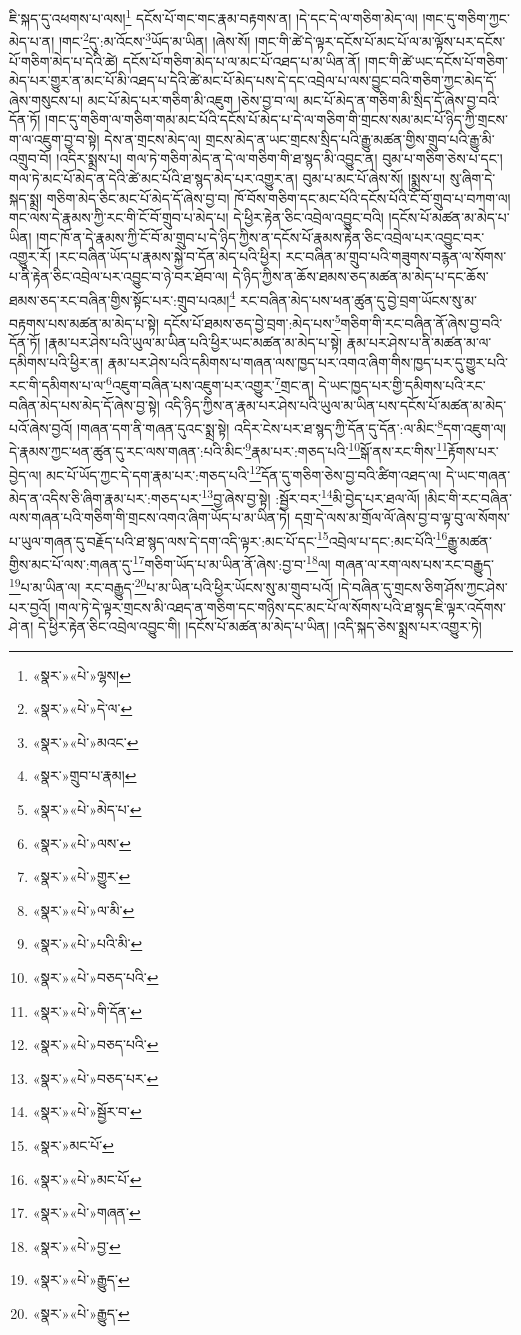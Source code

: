 ཇི་སྐད་དུ་འཕགས་པ་ལས།\footnote{«སྣར་»«པེ་»ལྷས།} དངོས་པོ་གང་གང་རྣམ་བརྟགས་ན། །དེ་དང་དེ་ལ་གཅིག་མེད་ལ། །གང་དུ་གཅིག་ཀྱང་མེད་པ་ན། །གང་\footnote{«སྣར་»«པེ་»དེ་ལ་}དུ་:མ་འོངས་\footnote{«སྣར་»«པེ་»མའང་}ཡོད་མ་ཡིན། །ཞེས་སོ། །གང་གི་ཚེ་དེ་ལྟར་དངོས་པོ་མང་པོ་ལ་མ་ལྟོས་པར་དངོས་པོ་གཅིག་མེད་པ་དེའི་ཚེ། དངོས་པོ་གཅིག་མེད་པ་ལ་མང་པོ་འཐད་པ་མ་ཡིན་ནོ། །གང་གི་ཚེ་ཡང་དངོས་པོ་གཅིག་མེད་པར་གྱུར་ན་མང་པོ་མི་འཐད་པ་དེའི་ཚེ་མང་པོ་མེད་པས་དེ་དང་འབྲེལ་པ་ལས་བྱུང་བའི་གཅིག་ཀྱང་མེད་དོ་ཞེས་གསུངས་པ། མང་པོ་མེད་པར་གཅིག་མི་འཇུག །ཅེས་བྱ་བ་ལ། མང་པོ་མེད་ན་གཅིག་མི་སྲིད་དོ་ཞེས་བྱ་བའི་དོན་ཏོ། །གང་དུ་གཅིག་ལ་གཅིག་གམ་མང་པོའི་དངོས་པོ་མེད་པ་དེ་ལ་གཅིག་གི་གྲངས་སམ་མང་པོ་ཉིད་ཀྱི་གྲངས་ག་ལ་འཇུག་བྱ་བ་སྟེ། དེས་ན་གྲངས་མེད་ལ། གྲངས་མེད་ན་ཡང་གྲངས་སྲིད་པའི་རྒྱུ་མཚན་གྱིས་གྲུབ་པའི་རྒྱུ་མི་འགྲུབ་བོ། །འདིར་སྨྲས་པ། གལ་ཏེ་གཅིག་མེད་ན་དེ་ལ་གཅིག་གི་ཐ་སྙད་མི་འབྱུང་ན། བུམ་པ་གཅིག་ཅེས་པ་དང་། གལ་ཏེ་མང་པོ་མེད་ན་དེའི་ཚེ་མང་པོའི་ཐ་སྙད་མེད་པར་འགྱུར་ན། བུམ་པ་མང་པོ་ཞེས་སོ། །སྨྲས་པ། སུ་ཞིག་དེ་སྐད་སྨྲ། གཅིག་མེད་ཅིང་མང་པོ་མེད་དོ་ཞེས་བྱ་བ། ཁོ་བོས་གཅིག་དང་མང་པོའི་དངོས་པོའི་ངོ་བོ་གྲུབ་པ་བཀག་ལ། གང་ལས་དེ་རྣམས་ཀྱི་རང་གི་ངོ་བོ་གྲུབ་པ་མེད་པ། དེ་ཕྱིར་རྟེན་ཅིང་འབྲེལ་འབྱུང་བའི། །དངོས་པོ་མཚན་མ་མེད་པ་ཡིན། །གང་ཁོ་ན་དེ་རྣམས་ཀྱི་ངོ་བོ་མ་གྲུབ་པ་དེ་ཉིད་ཀྱིས་ན་དངོས་པོ་རྣམས་རྟེན་ཅིང་འབྲེལ་པར་འབྱུང་བར་འགྱུར་རོ། །རང་བཞིན་ཡོད་པ་རྣམས་སྐྱེ་བ་དོན་མེད་པའི་ཕྱིར། རང་བཞིན་མ་གྲུབ་པའི་གཟུགས་བརྙན་ལ་སོགས་པ་ནི་རྟེན་ཅིང་འབྲེལ་པར་འབྱུང་བ་ཉེ་བར་ཐོབ་ལ། དེ་ཉིད་ཀྱིས་ན་ཆོས་ཐམས་ཅད་མཚན་མ་མེད་པ་དང་ཆོས་ཐམས་ཅད་རང་བཞིན་གྱིས་སྟོང་པར་:གྲུབ་པའམ།\footnote{«སྣར་»གྲུབ་པ་རྣམ།} རང་བཞིན་མེད་པས་ཕན་ཚུན་དུ་བྱེ་བྲག་ཡོངས་སུ་མ་བརྟགས་པས་མཚན་མ་མེད་པ་སྟེ། དངོས་པོ་ཐམས་ཅད་བྱེ་བྲག་:མེད་པས་\footnote{«སྣར་»«པེ་»མེད་པ་}གཅིག་གི་རང་བཞིན་ནོ་ཞེས་བྱ་བའི་དོན་ཏོ། །རྣམ་པར་ཤེས་པའི་ཡུལ་མ་ཡིན་པའི་ཕྱིར་ཡང་མཚན་མ་མེད་པ་སྟེ། རྣམ་པར་ཤེས་པ་ནི་མཚན་མ་ལ་དམིགས་པའི་ཕྱིར་ན། རྣམ་པར་ཤེས་པའི་དམིགས་པ་གཞན་ལས་ཁྱད་པར་འགའ་ཞིག་གིས་ཁྱད་པར་དུ་གྱུར་པའི་རང་གི་དམིགས་པ་ལ་\footnote{«སྣར་»«པེ་»ལས་}འཇུག་བཞིན་པས་འཇུག་པར་འགྱུར་\footnote{«སྣར་»«པེ་»གྱུར་}གྲང་ན། དེ་ཡང་ཁྱད་པར་གྱི་དམིགས་པའི་རང་བཞིན་མེད་པས་མེད་དོ་ཞེས་བྱ་སྟེ། འདི་ཉིད་ཀྱིས་ན་རྣམ་པར་ཤེས་པའི་ཡུལ་མ་ཡིན་པས་དངོས་པོ་མཚན་མ་མེད་པའོ་ཞེས་བྱའོ། །གཞན་དག་ནི་གཞན་དུའང་སྨྲ་སྟེ། འདིར་ངེས་པར་ཐ་སྙད་ཀྱི་དོན་དུ་དོན་:ལ་མིང་\footnote{«སྣར་»«པེ་»ལ་མི་}དག་འཇུག་ལ། དེ་རྣམས་ཀྱང་ཕན་ཚུན་དུ་རང་ལས་གཞན་:པའི་མིང་\footnote{«སྣར་»«པེ་»པའི་མི་}རྣམ་པར་:གཅད་པའི་\footnote{«སྣར་»«པེ་»བཅད་པའི་}སྒོ་ནས་རང་གིས་\footnote{«སྣར་»«པེ་»གི་དོན་}རྟོགས་པར་བྱེད་ལ། མང་པོ་ཡོད་ཀྱང་དེ་དག་རྣམ་པར་:གཅད་པའི་\footnote{«སྣར་»«པེ་»བཅད་པའི་}དོན་དུ་གཅིག་ཅེས་བྱ་བའི་ཚིག་འཐད་ལ། དེ་ཡང་གཞན་མེད་ན་འདིས་ཅི་ཞིག་རྣམ་པར་:གཅད་པར་\footnote{«སྣར་»«པེ་»བཅད་པར་}བྱ་ཞེས་བྱ་སྟེ། :སྦྱོར་བར་\footnote{«སྣར་»«པེ་»སྦྱོར་བ་}མི་བྱེད་པར་ཐལ་ལོ། །མིང་གི་རང་བཞིན་ལས་གཞན་པའི་གཅིག་གི་གྲངས་འགའ་ཞིག་ཡོད་པ་མ་ཡིན་ཏེ། དགྲ་དེ་ལས་མ་གྲོལ་ལོ་ཞེས་བྱ་བ་ལྟ་བུ་ལ་སོགས་པ་ཡུལ་གཞན་དུ་བརྗོད་པའི་ཐ་སྙད་ལས་དེ་དག་འདི་ལྟར་:མང་པོ་དང་\footnote{«སྣར་»མང་པོ་}འབྲེལ་པ་དང་:མང་པོའི་\footnote{«སྣར་»«པེ་»མང་པོ་}རྒྱུ་མཚན་གྱིས་མང་པོ་ལས་:གཞན་དུ་\footnote{«སྣར་»«པེ་»གཞན་}གཅིག་ཡོད་པ་མ་ཡིན་ནོ་ཞེས་:བྱ་བ་\footnote{«སྣར་»«པེ་»བྱ་}ལ། གཞན་ལ་རག་ལས་པས་རང་བརྒྱུད་\footnote{«སྣར་»«པེ་»རྒྱུད་}པ་མ་ཡིན་ལ། རང་བརྒྱུད་\footnote{«སྣར་»«པེ་»རྒྱུད་}པ་མ་ཡིན་པའི་ཕྱིར་ཡོངས་སུ་མ་གྲུབ་པའོ། །དེ་བཞིན་དུ་གྲངས་ཅིག་ཤོས་ཀྱང་ཤེས་པར་བྱའོ། །གལ་ཏེ་དེ་ལྟར་གྲངས་མི་འཐད་ན་གཅིག་དང་གཉིས་དང་མང་པོ་ལ་སོགས་པའི་ཐ་སྙད་ཇི་ལྟར་འདོགས་ཤེ་ན། དེ་ཕྱིར་རྟེན་ཅིང་འབྲེལ་འབྱུང་གི། །དངོས་པོ་མཚན་མ་མེད་པ་ཡིན། །འདི་སྐད་ཅེས་སྨྲས་པར་འགྱུར་ཏེ། 